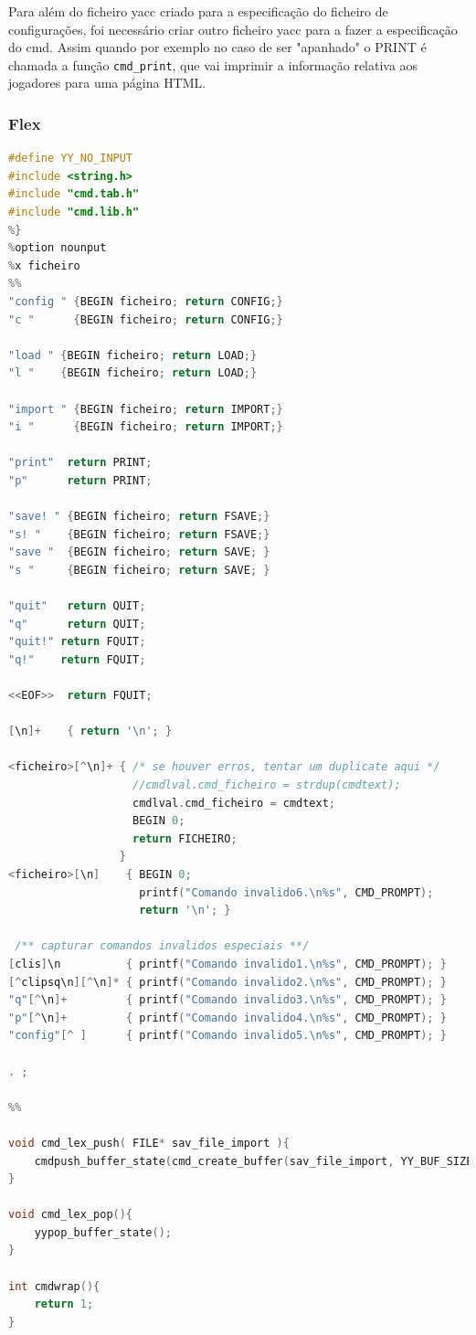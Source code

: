 \documentclass[11pt, a4paper, oneside]{article}
\begin{document}
Para além do ficheiro \textsf{yacc} criado para a especificação do ficheiro de configurações, foi necessário criar outro ficheiro \textsf{yacc} para a fazer a especificação do cmd. Assim quando por exemplo no caso de ser "apanhado" o \textsf{PRINT} é chamada a função \texttt{cmd\_print}, que vai imprimir a informação relativa aos jogadores para uma página \textsf{HTML}.

\subsubsection{\textsf{Flex}}

\begin{lstlisting}[language=C, caption={Flex do ficheiro cmd.}]
%{
#define YY_NO_INPUT
#include <string.h>
#include "cmd.tab.h"
#include "cmd.lib.h"
%}
%option nounput
%x ficheiro
%%
"config " {BEGIN ficheiro; return CONFIG;}
"c "      {BEGIN ficheiro; return CONFIG;}

"load " {BEGIN ficheiro; return LOAD;}
"l "    {BEGIN ficheiro; return LOAD;}

"import " {BEGIN ficheiro; return IMPORT;}
"i "      {BEGIN ficheiro; return IMPORT;}

"print"  return PRINT;
"p"      return PRINT;

"save! " {BEGIN ficheiro; return FSAVE;}
"s! "    {BEGIN ficheiro; return FSAVE;}
"save "  {BEGIN ficheiro; return SAVE; }
"s "     {BEGIN ficheiro; return SAVE; }

"quit"   return QUIT;
"q"      return QUIT;
"quit!" return FQUIT;
"q!"    return FQUIT;

<<EOF>>  return FQUIT;

[\n]+    { return '\n'; }

<ficheiro>[^\n]+ { /* se houver erros, tentar um duplicate aqui */
                   //cmdlval.cmd_ficheiro = strdup(cmdtext);
                   cmdlval.cmd_ficheiro = cmdtext;
                   BEGIN 0;
                   return FICHEIRO;
                 }
<ficheiro>[\n]    { BEGIN 0;
                    printf("Comando invalido6.\n%s", CMD_PROMPT);
                    return '\n'; }

 /** capturar comandos invalidos especiais **/
[clis]\n          { printf("Comando invalido1.\n%s", CMD_PROMPT); }
[^clipsq\n][^\n]* { printf("Comando invalido2.\n%s", CMD_PROMPT); }
"q"[^\n]+         { printf("Comando invalido3.\n%s", CMD_PROMPT); }
"p"[^\n]+         { printf("Comando invalido4.\n%s", CMD_PROMPT); }
"config"[^ ]      { printf("Comando invalido5.\n%s", CMD_PROMPT); }

. ;

%%

void cmd_lex_push( FILE* sav_file_import ){
    cmdpush_buffer_state(cmd_create_buffer(sav_file_import, YY_BUF_SIZE));
}

void cmd_lex_pop(){
    yypop_buffer_state();
}

int cmdwrap(){
    return 1;
}
\end{lstlisting}
\end{document}
